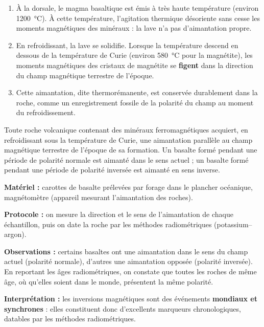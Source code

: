 \documentclass[11pt]{article}
\newcommand{\cle}[1]{{\popxbold\color{popdark}#1}}
\begin{document}
\begin{enumerate}
\item À la dorsale, le magma basaltique est émis à très haute température (environ \SI{1200}{\celsius}). À cette température, l'agitation thermique désoriente sans cesse les moments magnétiques des minéraux : la lave n'a pas d'aimantation propre.
\item En refroidissant, la lave se solidifie. Lorsque la température descend en dessous de la \cle{température de Curie} (environ \SI{580}{\celsius} pour la magnétite), les moments magnétiques des cristaux de magnétite se \textbf{figent} dans la direction du champ magnétique terrestre de l'époque.
\item Cette aimantation, dite \cle{thermorémanente}, est conservée durablement dans la roche, comme un enregistrement fossile de la polarité du champ au moment du refroidissement.
\end{enumerate}

\begin{aretenir}
Toute roche volcanique contenant des minéraux ferromagnétiques acquiert, en refroidissant sous la température de Curie, une aimantation parallèle au champ magnétique terrestre de l'époque de sa formation. Un basalte formé pendant une période de polarité normale est aimanté dans le sens actuel ; un basalte formé pendant une période de polarité inversée est aimanté en sens inverse.
\end{aretenir}

\begin{experience}
\textbf{Matériel :} carottes de basalte prélevées par forage dans le plancher océanique, magnétomètre (appareil mesurant l'aimantation des roches).\par
\textbf{Protocole :} on mesure la direction et le sens de l'aimantation de chaque échantillon, puis on date la roche par les méthodes radiométriques (potassium--argon).\par
\textbf{Observations :} certains basaltes ont une aimantation dans le sens du champ actuel (polarité normale), d'autres une aimantation opposée (polarité inversée). En reportant les âges radiométriques, on constate que toutes les roches de même âge, où qu'elles soient dans le monde, présentent la même polarité.\par
\textbf{Interprétation :} les inversions magnétiques sont des événements \textbf{mondiaux et synchrones} : elles constituent donc d'excellents marqueurs chronologiques, datables par les méthodes radiométriques.
\end{experience}
\end{document}
